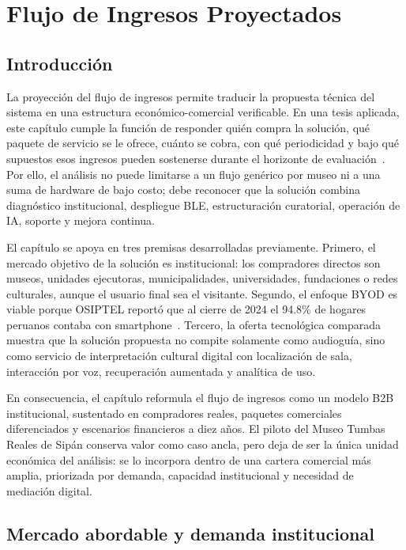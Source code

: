 \chapter{Flujo de Ingresos Proyectados}

\section{Introducción}

La proyección del flujo de ingresos permite traducir la propuesta técnica del sistema en una estructura económico-comercial verificable. En una tesis aplicada, este capítulo cumple la función de responder quién compra la solución, qué paquete de servicio se le ofrece, cuánto se cobra, con qué periodicidad y bajo qué supuestos esos ingresos pueden sostenerse durante el horizonte de evaluación~\cite{europeancommission2014cba,unido2017manual}. Por ello, el análisis no puede limitarse a un flujo genérico por museo ni a una suma de hardware de bajo costo; debe reconocer que la solución combina diagnóstico institucional, despliegue BLE, estructuración curatorial, operación de IA, soporte y mejora continua.

El capítulo se apoya en tres premisas desarrolladas previamente. Primero, el mercado objetivo de la solución es institucional: los compradores directos son museos, unidades ejecutoras, municipalidades, universidades, fundaciones o redes culturales, aunque el usuario final sea el visitante. Segundo, el enfoque BYOD es viable porque OSIPTEL reportó que al cierre de 2024 el 94.8\% de hogares peruanos contaba con smartphone~\cite{osiptel2024smartphone}. Tercero, la oferta tecnológica comparada muestra que la solución propuesta no compite solamente como audioguía, sino como servicio de interpretación cultural digital con localización de sala, interacción por voz, recuperación aumentada y analítica de uso.

En consecuencia, el capítulo reformula el flujo de ingresos como un modelo B2B institucional, sustentado en compradores reales, paquetes comerciales diferenciados y escenarios financieros a diez años. El piloto del Museo Tumbas Reales de Sipán conserva valor como caso ancla, pero deja de ser la única unidad económica del análisis: se lo incorpora dentro de una cartera comercial más amplia, priorizada por demanda, capacidad institucional y necesidad de mediación digital.

\section{Mercado abordable y demanda institucional}


